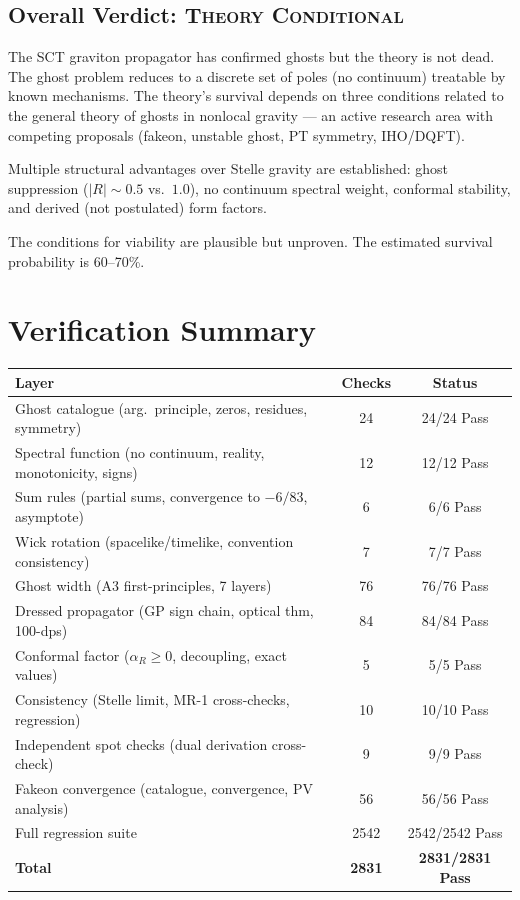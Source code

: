\documentclass[11pt,a4paper]{article}
\begin{document}
\subsection*{Overall Verdict: \textsc{Theory Conditional}}

The SCT graviton propagator has confirmed ghosts but the theory is not
dead.  The ghost problem reduces to a discrete set of poles (no
continuum) treatable by known mechanisms.  The theory's survival depends
on three conditions related to the general theory of ghosts in nonlocal
gravity --- an active research area with competing proposals (fakeon,
unstable ghost, PT symmetry, IHO/DQFT).

Multiple structural advantages over Stelle gravity are established:
ghost suppression ($|R| \sim 0.5$ vs.\ $1.0$), no continuum spectral
weight, conformal stability, and derived (not postulated) form factors.

The conditions for viability are plausible but unproven.  The estimated
survival probability is 60--70\%.


\section{Verification Summary}
\label{sec:verification}

\begin{center}
\begin{tabular}{lcc}
\toprule
Layer & Checks & Status \\
\midrule
Ghost catalogue (arg.\ principle, zeros, residues, symmetry) & 24 &
  24/24 Pass \\
Spectral function (no continuum, reality, monotonicity, signs) & 12 &
  12/12 Pass \\
Sum rules (partial sums, convergence to $-6/83$, asymptote) & 6 &
  6/6 Pass \\
Wick rotation (spacelike/timelike, convention consistency) & 7 &
  7/7 Pass \\
Ghost width (A3 first-principles, 7 layers) & 76 &
  76/76 Pass \\
Dressed propagator (GP sign chain, optical thm, 100-dps) & 84 &
  84/84 Pass \\
Conformal factor ($\alpha_R \geq 0$, decoupling, exact values) & 5 &
  5/5 Pass \\
Consistency (Stelle limit, MR-1 cross-checks, regression) & 10 &
  10/10 Pass \\
Independent spot checks (dual derivation cross-check) & 9 &
  9/9 Pass \\
Fakeon convergence (catalogue, convergence, PV analysis) & 56 &
  56/56 Pass \\
Full regression suite & 2542 & 2542/2542 Pass \\
\midrule
\textbf{Total} & \textbf{2831} & \textbf{2831/2831 Pass} \\
\bottomrule
\end{tabular}
\end{center}
\end{document}
